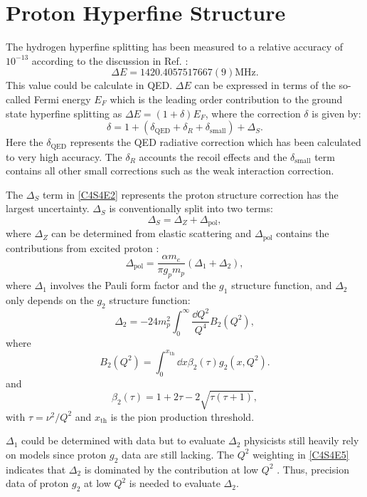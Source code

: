 \section{Proton Hyperfine Structure}
\label{C4S4}

The hydrogen hyperfine splitting has been measured to a relative accuracy of $10^{-13}$ according to the discussion in Ref. \cite{Nazaryan2006}:
\begin{equation} \label{C4S4E1}
\Delta E = 1420.405 751 766 7(9) \text{MHz}.
\end{equation}
This value could be calculate in QED. $\Delta E$ can be expressed in terms of the so-called Fermi energy $E_F$ which is the leading order contribution to the ground state hyperfine splitting as $\Delta E = (1+\delta)E_F$, where the correction $\delta$ is given by:
\begin{equation} \label{C4S4E2}
\delta = 1+(\delta_{\mathrm{QED}}+\delta_R+\delta_{\mathrm{small}})+\Delta_S.
\end{equation}
Here the $\delta_{\mathrm{QED}}$ represents the QED radiative correction which has been calculated to very high accuracy. The $\delta_R$ accounts the recoil effects and the $\delta_{\mathrm{small}}$ term contains all other small corrections such as the weak interaction correction.

The $\Delta_S$ term in \cref{C4S4E2} represents the proton structure correction has the largest uncertainty. $\Delta_S$ is conventionally split into two terms:
\begin{equation} \label{C4S4E3}
\Delta_S = \Delta_Z+\Delta_{\mathrm{pol}},
\end{equation}
where $\Delta_Z$ can be determined from elastic scattering \cite{GEP} and $\Delta_{\mathrm{pol}}$ contains the contributions from excited proton \cite{Iddings1965,Faustov2002}:
\begin{equation} \label{C4S4E4}
\Delta_{\text{pol}} = \frac{\alpha m_e}{\pi g_pm_p}(\Delta_1+\Delta_2),
\end{equation}
where $\Delta_1$ involves the Pauli form factor and the $g_1$ structure function, and $\Delta_2$ only depends on the $g_2$ structure function:
\begin{equation} \label{C4S4E5}
\Delta_2 = -24m_p^2\int_0^{\infty}\frac{\dd{Q}^2}{Q^4}B_2(Q^2),
\end{equation}
where
\begin{equation} \label{C4S4E6}
B_2(Q^2) = \int_0^{x_{\mathrm{th}}}\dd{x}\beta_2(\tau)g_2(x,Q^2).
\end{equation}
and
\begin{equation} \label{C4S4E7}
\beta_2(\tau) = 1+2\tau-2\sqrt{\tau(\tau+1)},
\end{equation}
with $\tau=\nu^2/Q^2$ and $x_{\mathrm{th}}$ is the pion production threshold.

$\Delta_1$ could be determined with data but to evaluate $\Delta_2$ physicists still heavily rely on models since proton $g_2$ data are still lacking. The $Q^2$ weighting in \cref{C4S4E5} indicates that $\Delta_2$ is dominated by the contribution at low $Q^2$ \cite{Nazaryan2006}. Thus, precision data of proton $g_2$ at low $Q^2$ is needed to evaluate $\Delta_2$.

